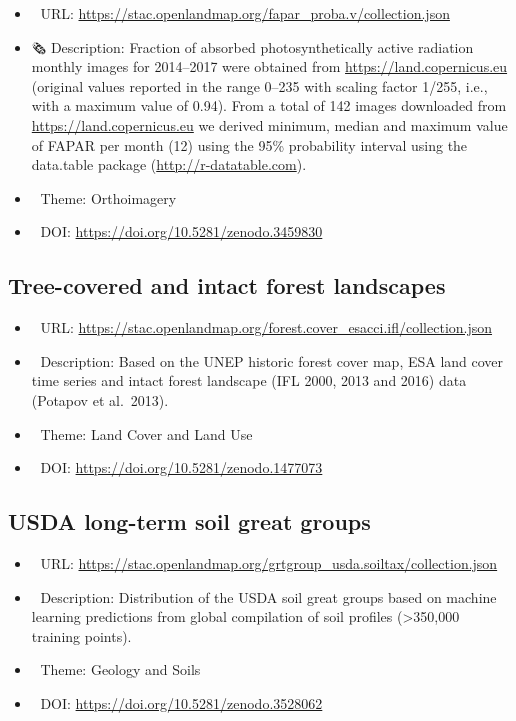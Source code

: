 \documentclass[
  graybox,natbib,nospthms]{svmono}
\providecommand{\tightlist}{%
  \setlength{\itemsep}{0pt}\setlength{\parskip}{0pt}}
\providecommand{\tightlist}{\setlength{\itemsep}{0pt}\setlength{\parskip}{0pt}}
\begin{document}
\begin{itemize}
\tightlist
\item
  🔗 URL: \url{https://stac.openlandmap.org/fapar_proba.v/collection.json}
\item
  🗞 Description: Fraction of absorbed photosynthetically active radiation monthly images for 2014--2017 were obtained from \url{https://land.copernicus.eu} (original values reported in the range 0--235 with scaling factor 1/255, i.e., with a maximum value of 0.94). From a total of 142 images downloaded from \url{https://land.copernicus.eu} we derived minimum, median and maximum value of FAPAR per month (12) using the 95\% probability interval using the data.table package (\url{http://r-datatable.com}).
\item
  📝 Theme: Orthoimagery
\item
  📂 DOI: \url{https://doi.org/10.5281/zenodo.3459830}
\end{itemize}

\hypertarget{tree-covered-and-intact-forest-landscapes}{%
\subsection{Tree-covered and intact forest landscapes}\label{tree-covered-and-intact-forest-landscapes}}

\begin{itemize}
\tightlist
\item
  🔗 URL: \url{https://stac.openlandmap.org/forest.cover_esacci.ifl/collection.json}
\item
  📰 Description: Based on the UNEP historic forest cover map, ESA land cover time series and intact forest landscape (IFL 2000, 2013 and 2016) data (Potapov et al.~2013).
\item
  📝 Theme: Land Cover and Land Use
\item
  📂 DOI: \url{https://doi.org/10.5281/zenodo.1477073}
\end{itemize}

\hypertarget{usda-long-term-soil-great-groups}{%
\subsection{USDA long-term soil great groups}\label{usda-long-term-soil-great-groups}}

\begin{itemize}
\tightlist
\item
  🔗 URL: \url{https://stac.openlandmap.org/grtgroup_usda.soiltax/collection.json}
\item
  📰 Description: Distribution of the USDA soil great groups based on machine learning predictions from global compilation of soil profiles (\textgreater350,000 training points).
\item
  📝 Theme: Geology and Soils
\item
  📂 DOI: \url{https://doi.org/10.5281/zenodo.3528062}
\end{itemize}
\end{document}
